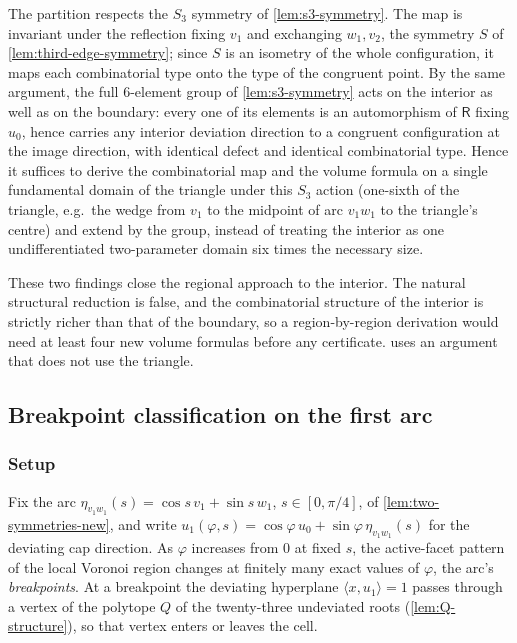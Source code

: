 \documentclass[11pt,reqno]{amsart}
\renewcommand{\_}{\origunderscore\allowbreak}
\numberwithin{equation}{section}
\theoremstyle{plain}
\theoremstyle{definition}
\theoremstyle{remark}
\newcommand{\Rt}{\mathsf{R}}                 %
\newcommand{\tilt}{\varphi}                  %
\newcommand{\arcp}{s}                        %
\newcommand{\dev}{\eta}                      %
\begin{document}
The partition respects the $S_3$ symmetry of \cref{lem:s3-symmetry}. The
map is invariant under the reflection fixing $v_1$ and exchanging
$w_1,v_2$, the symmetry $S$ of \cref{lem:third-edge-symmetry}; since $S$
is an isometry of the whole configuration, it maps each combinatorial
type onto the type of the congruent point. By the same argument, the
full $6$-element group of \cref{lem:s3-symmetry} acts on the interior as
well as on the boundary: every one of its
elements is an automorphism of $\Rt$ fixing $u_0$, hence carries any
interior deviation direction to a congruent configuration at the image
direction, with identical defect and identical combinatorial type. Hence it
suffices to derive the combinatorial map and
the volume formula on a single fundamental domain of the triangle under
this $S_3$ action (one-sixth of the triangle, e.g.\ the wedge from
$v_1$ to the midpoint of arc $v_1w_1$ to the triangle's centre) and extend by the group, instead of treating the interior as one
undifferentiated two-parameter domain six times the necessary size.

These two findings close the regional approach to the interior. The
natural structural reduction is false, and the
combinatorial structure of the interior is strictly richer than that of
the boundary, so a region-by-region derivation would need at least four
new volume formulas before any certificate. 
uses an argument that does not use the triangle.

\subsection{Breakpoint classification on the first arc}\label{sec:arc1-breakpoints}

\subsubsection{Setup}

Fix the arc $\dev_{v_1w_1}(\arcp)=\cos\arcp\,v_1+\sin\arcp\,w_1$,
$\arcp\in[0,\pi/4]$, of \cref{lem:two-symmetries-new}, and write
$u_1(\tilt,\arcp)=\cos\tilt\,u_0+\sin\tilt\,\dev_{v_1w_1}(\arcp)$ for the
deviating cap direction. As $\tilt$ increases from $0$ at fixed $\arcp$,
the active-facet pattern of the local Voronoi region changes at finitely
many exact values of $\tilt$, the arc's \emph{breakpoints}. At a breakpoint the deviating
hyperplane $\langle x,u_1\rangle=1$ passes through a vertex of the
polytope $Q$ of the twenty-three undeviated roots (\cref{lem:Q-structure}),
so that vertex enters or leaves the cell.
\end{document}

